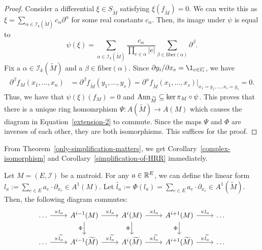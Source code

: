 \documentclass{puthesis-UG}
\begin{document}
\begin{proof}
Consider a differential $\xi \in S_{\widetilde{M}}$ satisfying $\xi(f_{\widetilde{M}}) = 0$. We can write this as $\xi = \sum_{\alpha \in \mathcal{I}_k (\widetilde{M})} c_\alpha \partial^\alpha$ for some real constants $c_\alpha$. Then, its image under $\psi$ is equal to
\[
	\psi(\xi) = \sum_{\alpha \in \mathcal{I}_k (\widetilde{M})} \frac{c_\alpha}{\prod_{e \in \alpha} |e|}\sum_{\beta \in \text{fiber}(\alpha)} \partial^\beta.
\]
Fix a $\alpha \in \mathcal{I}_k(\widetilde{M})$ and a $\beta \in \text{fiber}(\alpha)$. Since $\partial y_i / \partial x_e = \1_{e \in \overline{e_i}}$, we have  
\begin{align*}
	\partial^\beta f_M (x_1, \ldots, x_n) & = \partial^\beta f_{\widetilde{M}} (y_1, \ldots, y_s) = \partial^\alpha f_{\widetilde{M}} (x_1, \ldots, x_s) |_{x_1 = y_1, \ldots, x_s = y_s} = 0.
\end{align*}
Thus, we have that $\psi (\xi)(f_M) = 0$ and $\operatorname{Ann}_{\widetilde{M}} \subseteq \ker \pi_M \circ \psi$. This proves that there is a unique ring homomrphism $\Psi : A(\widetilde{M}) \to A(M)$ which causes the diagram in Equation~\ref{extension-2} to commute. Since the maps $\Psi$ and $\Phi$ are inverses of each other, they are both isomorphisms. This suffices for the proof.
\end{proof}

From Theorem~\ref{only-simplification-matters}, we get Corollary~\ref{complex-isomorphism} and Corollary~\ref{simplification-of-HRR} immediately. 

\begin{cor} \label{complex-isomorphism}
	Let $M = (E, \mathcal{I})$ be a matroid. For any $a \in \mathbb{R}^E$, we can define the linear form $l_a := \sum_{e \in E} a_e \cdot \partial_{x_e} \in A^1(M)$. Let $\widetilde{l_a} := \Phi(l_a) = \sum_{e \in E} a_e \cdot \partial_{x_{\overline{e}}} \in A^1(\widetilde{M})$. Then, the following diagram commutes:
	\[\begin{tikzcd}
	\ldots & {A^{i-1}(M)} & {A^i(M)} & {A^{i+1}(M)} & \ldots \\
	\ldots & {A^{i-1}(\widetilde{M})} & {A^i(\widetilde{M})} & {A^{i+1}(\widetilde{M})} & \ldots
	\arrow["{\times l_a}", from=1-1, to=1-2]
	\arrow["{\times \widetilde{l_a}}", from=2-1, to=2-2]
	\arrow["\Phi"', from=1-2, to=2-2]
	\arrow["{\times l_a}", from=1-2, to=1-3]
	\arrow["{\times \widetilde{l_a}}", from=2-2, to=2-3]
	\arrow["{\times l_a}", from=1-3, to=1-4]
	\arrow["{\times \widetilde{l_a}}", from=2-3, to=2-4]
	\arrow["\Phi"', from=1-3, to=2-3]
	\arrow["\Phi"', from=1-4, to=2-4]
	\arrow["{\times l_a}", from=1-4, to=1-5]
	\arrow["{\times \widetilde{l_a}}", from=2-4, to=2-5]
\end{tikzcd}\]
 \end{cor}
\end{document}
